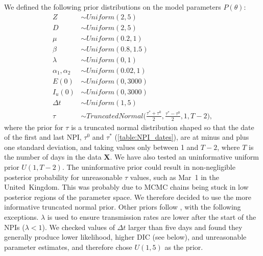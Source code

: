 \documentclass[12pt]{extarticle}
\let\vec\mathbf
\begin{document}
We defined the following prior distributions on the model parameters $P(\theta)$: 
\begin{equation} \label{eq:priors}
\begin{aligned} %
Z & \sim \mathit{Uniform}(2, 5) \\
D & \sim \mathit{Uniform}(2, 5) \\
\mu & \sim \mathit{Uniform}(0.2, 1) \\
\beta & \sim \mathit{Uniform}(0.8, 1.5) \\
\lambda & \sim \mathit{Uniform}(0, 1) \\
\alpha_1, \alpha_2 & \sim \mathit{Uniform}(0.02, 1)\\
E(0) & \sim \mathit{Uniform}(0, 3000) \\
I_u(0) & \sim \mathit{Uniform}(0, 3000) \\
\Delta t & \sim \mathit{Uniform}(1, 5) \\
\tau &\sim \mathit{TruncatedNormal}\Big(\frac{\tau^*+\tau^0}{2}, \frac{\tau^*-\tau^0}{2}, 1, T-2\Big),
\end{aligned}
\end{equation}
where the prior for $\tau$ is a truncated normal distribution shaped so that the date of the first and last NPI, $\tau^0$ and $\tau^*$ (\autoref{table:NPI_dates}), are at minus and plus one standard deviation, and taking values only between 1 and  $T-2$, where $T$ is the number of days in the data $\vec{X}$.
We have also tested an uninformative uniform prior $U(1,T-2)$. The uninformative prior could result in non-negligible posterior probability for unreasonable $\tau$ values, such as Mar~1 in the United~Kingdom. This was probably due to MCMC chains being stuck in low posterior regions of the parameter space. We therefore decided to use the more informative truncated normal prior.
Other priors follow \citet{Li2020}, with the following exceptions.
$\lambda$ is used to ensure transmission rates are lower after the start of the NPIs ($\lambda < 1$).
We checked values of $\Delta t$ larger than five days and found they generally produce lower likelihood, higher DIC (see below), and unreasonable parameter estimates, and therefore chose $U(1,5)$ as the prior.



\end{document}
